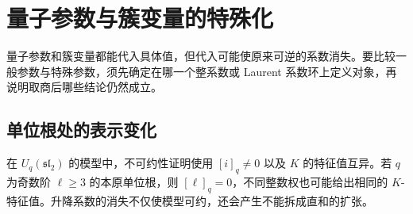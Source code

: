 %
%
\section{量子参数与簇变量的特殊化}
\label{b5:sec:B04}

量子参数和簇变量都能代入具体值，但代入可能使原来可逆的系数消失。要比较一般参数与特殊参数，须先确定在哪一个整系数或 Laurent 系数环上定义对象，再说明取商后哪些结论仍然成立。

\subsection{单位根处的表示变化}
\label{b5:subsec:B04:01}

在 \(U_q(\mathfrak{sl}_2)\) 的模型中，不可约性证明使用 \([i]_q\ne0\) 以及 \(K\) 的特征值互异。若 \(q\) 为奇数阶 \(\ell\ge3\) 的本原单位根，则 \([\ell]_q=0\)，不同整数权也可能给出相同的 \(K\)-特征值。升降系数的消失不仅使模型可约，还会产生不能拆成直和的扩张。

